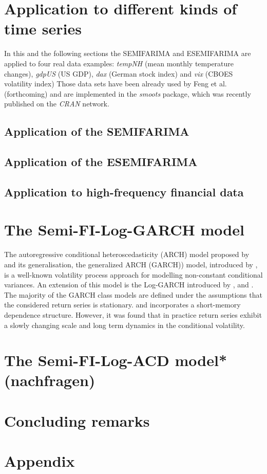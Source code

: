 \documentclass[12pt]{article}
\begin{document}



\section{Application to different kinds of time series}
In this and the following sections the SEMIFARIMA and ESEMIFARIMA are applied to four real data examples: \textit{tempNH} (mean monthly temperature changes), \textit{gdpUS} (US GDP), \textit{dax} (German stock index) and \textit{vix} (CBOES volatility index) Those data sets have been already used by Feng et al. (forthcoming) and are implemented in the \textit{smoots} package, which was recently published on the \textit{CRAN} network.

\subsection{Application of the SEMIFARIMA}

\subsection{Application of the ESEMIFARIMA}

\subsection{Application to high-frequency financial data}

\section{The Semi-FI-Log-GARCH model}
The autoregressive conditional heteroscedasticity (ARCH) model proposed by \citet{engle1982autoregressive} and its generalisation, the generalized ARCH (GARCH)) model, introduced by \citet{bollerslev1986generalized} , is a well-known volatility process approach for modelling non-constant conditional variances. An extension of this model is the Log-GARCH introduced by \citet{pantula1986modeling}, \citet{geweke1986comment} and \citet{milhoj1987conditional}. The majority of the GARCH class models are defined under the assumptions that the considered return series is stationary.  and incorporates a short-memory dependence structure. However, it was found that in practice return series exhibit a slowly changing scale and long term dynamics in the conditional volatility. 


\section{The Semi-FI-Log-ACD model* (nachfragen)}

\section{Concluding remarks}

\printbibliography

\section*{Appendix}
\end{document}
